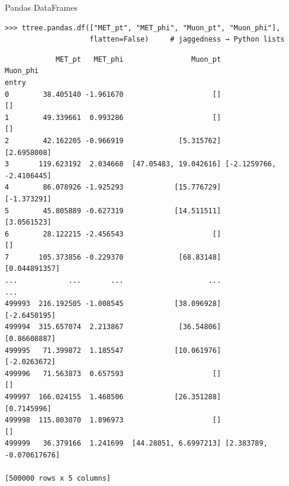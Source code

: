 \documentclass[aspectratio=169]{beamer}
\begin{document}
\begin{frame}[fragile]{Pandas DataFrames}
\small
\begin{verbatim}
>>> ttree.pandas.df(["MET_pt", "MET_phi", "Muon_pt", "Muon_phi"],
                    flatten=False)     # jaggedness → Python lists
\end{verbatim}
\scriptsize\color{darkblue}\vspace{-0.75\baselineskip}\begin{verbatim}
            MET_pt   MET_phi                Muon_pt                 Muon_phi
entry                                                                       
0        38.405140 -1.961670                     []                       []
1        49.339661  0.993286                     []                       []
2        42.162205 -0.966919             [5.315762]              [2.6958008]
3       119.623192  2.034668  [47.05483, 19.042616] [-2.1259766, -2.4106445]
4        86.078926 -1.925293            [15.776729]              [-1.373291]
5        45.805889 -0.627319            [14.511511]              [3.0561523]
6        28.122215 -2.456543                     []                       []
7       105.373856 -0.229370             [68.83148]            [0.044891357]
...            ...       ...                    ...                      ...
499993  216.192505 -1.008545            [38.096928]             [-2.6450195]
499994  315.657074  2.213867             [36.54806]             [0.86608887]
499995   71.399872  1.185547            [10.061976]             [-2.0263672]
499996   71.563873  0.657593                     []                       []
499997  166.024155  1.468506            [26.351288]              [0.7145996]
499998  115.803070  1.896973                     []                       []
499999   36.379166  1.241699  [44.28051, 6.6997213] [2.383789, -0.070617676]

[500000 rows x 5 columns]
\end{verbatim}
\end{frame}
\end{document}
